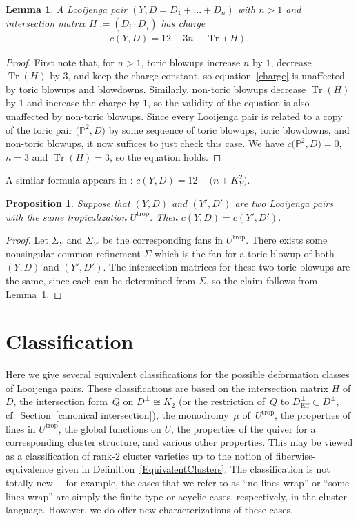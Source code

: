 \documentclass[10pt,a4paper]{amsart}
\numberwithin{equation}{section}
\numberwithin{figure}{section}
\numberwithin{table}{section}
\DeclareMathOperator{\Tr}{Tr}
\DeclareMathOperator{\trop}{trop}
\DeclareMathOperator{\Eff}{Eff}
\let\bb=\mathbb
\newtheorem{lem}[thm]{Lemma}
\newtheorem{prop}[thm]{Proposition}
\theoremstyle{definition}
\begin{document}
\begin{lem} \label{ch}A Looijenga pair $(Y,D=D_1+\dots+D_n)$ with $n>1$ and intersection matrix $H:= (D_i\cdot D_j )$ has charge
\begin{gather}\label{charge}
	c(Y,D)=12-3n-\Tr(H).
\end{gather}
\end{lem}

\begin{proof}First note that, for $n>1$, toric blowups increase $n$ by $1$, decrease $\Tr(H)$ by $3$, and keep the charge constant, so equation~\eqref{charge} is unaffected by toric blowups and blowdowns. Similarly, non-toric blowups decrease $\Tr(H)$ by $1$ and increase the charge by $1$, so the validity of the equation is also unaffected by non-toric blowups. Since every Looijenga pair is related to a copy of the toric pair $\big(\bb{P}^2,D\big)$ by some sequence of toric blowups, toric blowdowns, and non-toric blowups, it now suffices to just check this case. We have $c\big(\bb{P}^2,D\big)=0$, $n=3$ and $\Tr(H)=3$, so the equation holds.
\end{proof}

A similar formula appears in \cite{GHK2}: $c(Y,D)=12-\big(n+K_Y^2\big)$.

\begin{prop}\label{TropCharge}Suppose that $(Y,D)$ and $(Y',D')$ are two Looijenga pairs with the same tropicalization $U^{\trop}$. Then $c(Y,D)=c(Y',D')$.
\end{prop}

\begin{proof}Let $\Sigma_Y$ and $\Sigma_{Y'}$ be the corresponding fans in $U^{\trop}$. There exists some nonsingular common refinement $\Sigma$ which is the fan for a toric blowup of both $(Y,D)$ and $(Y',D')$. The intersection matrices for these two toric blowups are the same, since each can be determined from $\Sigma$, so the claim follows from Lemma~\ref{ch}.
\end{proof}

\section{Classification}\label{classification}

Here we give several equivalent classifications for the possible deformation classes of Looijenga pairs. These classifications are based on the intersection matrix $H$ of $D$, the intersection form~$Q$ on $D^{\perp}\cong K_2$ (or the restriction of~$Q$ to $D^{\perp}_{\Eff} \subset D^{\perp}$, cf.\ Section~\ref{canonical intersection}), the monodromy~$\mu$ of~$U^{\trop}$, the properties of lines in $U^{\trop}$, the global functions on $U$, the properties of the quiver for a corresponding cluster structure, and various other properties. This may be viewed as a classification of rank-$2$ cluster varieties up to the notion of fiberwise-equivalence given in Definition~\ref{EquivalentClusters}. The classification is not totally new~-- for example, the cases that we refer to as ``no lines wrap'' or ``some lines wrap'' are simply the finite-type or acyclic cases, respectively, in the cluster language. However, we do offer new characterizations of these cases.
\end{document}
